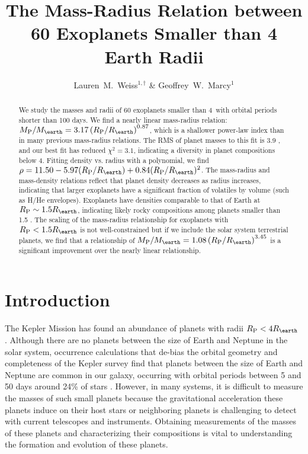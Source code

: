 \documentclass[iop]{emulateapj}
\begin{document}
\title{The Mass-Radius Relation between 60 Exoplanets Smaller than 4 Earth Radii}
\author{Lauren~M.~Weiss$^{1,\dagger}$ \& Geoffrey~W.~Marcy$^1$}


\begin{abstract}
We study the masses and radii of 60 exoplanets smaller than 4\rearth\ with orbital periods shorter than 100 days.  We find a nearly linear mass-radius relation: $\mpl/\mearth = 3.17 \left(\rpl/\rearth\right)^{0.87}$, which is a shallower power-law index than in many previous mass-radius relations.  The RMS of planet masses to this fit is 3.9 \mearth, and our best fit has reduced $\chi^2=3.1$, indicating a diversity in planet compositions below 4\rearth.  Fitting density vs. radius with a polynomial, we find $\rho = 11.50 -5.97(\rpl/\rearth) + 0.84(\rpl/\rearth)^2$.  The mass-radius and mass-density relations reflect that planet density decreases as radius increases, indicating that larger exoplanets have a significant fraction of volatiles by volume (such as H/He envelopes).  Exoplanets have densities comparable to that of Earth at  $\rpl \sim1.5\rearth$, indicating likely rocky compositions among planets smaller than 1.5 \rearth. The scaling of the mass-radius relationship for exoplanets with $\rpl < 1.5 \rearth$ is not well-constrained but if we include the solar system terrestrial planets, we find that a relationship of $\mpl/\mearth = 1.08 \left(\rpl/\rearth\right)^{3.45}$ is a significant improvement over the nearly linear relationship.
\end{abstract}


\section{Introduction}

The Kepler Mission has found an abundance of planets with radii $\rpl < 4\rearth$ \citep{Batalha2013}.  Although there are no planets between the size of Earth and Neptune in the solar system, occurrence calculations that de-bias the orbital geometry and completeness of the Kepler survey find that planets between the size of Earth and Neptune are common in our galaxy, occurring with orbital periods between 5 and 50 days around 24\% of stars \citep{Petigura2013a}.  However, in many systems, it is difficult to measure the masses of such small planets because the gravitational acceleration these planets induce on their host stars or neighboring planets is challenging to detect with current telescopes and instruments.  Obtaining measurements of the masses of these planets and characterizing their compositions is vital to understanding the formation and evolution of these planets.
\end{document}
